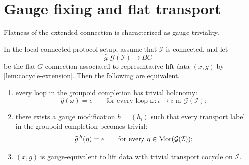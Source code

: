 \section{Gauge fixing and flat transport}
\label{sec:lift-flat}
Flatness of the extended connection is characterized as gauge
triviality.
\begin{theorem}
	\label{thm:flat-trivialization}
	In the local connected-protocol setup, assume that \(\mathcal I\) is
	connected, and let
	\[
		\widehat g:\mathcal G(\mathcal I)\to BG
	\]
	be the flat \(G\)-connection associated to representative lift data
	\((x,g)\) by \cref{lem:cocycle-extension}.
	Then the following are equivalent.
	\begin{enumerate}[label=\textup{(\roman*)}]
		\item every loop in the groupoid completion has trivial holonomy:
		      \[
			      \widehat g(\omega)=e
			      \qquad
			      \text{for every loop }\omega:i\to i
			      \text{ in }\mathcal G(\mathcal I);
		      \]
		\item there exists a gauge modification \(h=(h_i)\) such that every
		      transport label in the groupoid completion becomes trivial:
		      \[
			      \widehat g^{\,h}(\eta)=e
			      \qquad
			      \text{for every }\eta\in\mathrm{Mor}(\mathcal G(\mathcal I));
		      \]
		\item \((x,g)\) is gauge-equivalent to lift data with trivial transport
		      cocycle on \(\mathcal I\).
	\end{enumerate}
\end{theorem}
